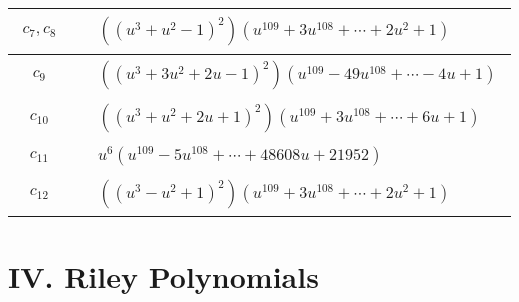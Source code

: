 \documentclass[1p]{elsarticle_modified}
\theoremstyle{definition}
\begin{document}
\begin{tabular}{m{50pt}|m{274pt}}
\hline $$\begin{aligned}c_{7},c_{8}\end{aligned}$$&$\begin{aligned}
&((u^3+u^2-1)^2)(u^{109}+3 u^{108}+\cdots+2 u^2+1)
\end{aligned}$\\
\hline $$\begin{aligned}c_{9}\end{aligned}$$&$\begin{aligned}
&((u^3+3 u^2+2 u-1)^2)(u^{109}-49 u^{108}+\cdots-4 u+1)
\end{aligned}$\\
\hline $$\begin{aligned}c_{10}\end{aligned}$$&$\begin{aligned}
&((u^3+u^2+2 u+1)^2)(u^{109}+3 u^{108}+\cdots+6 u+1)
\end{aligned}$\\
\hline $$\begin{aligned}c_{11}\end{aligned}$$&$\begin{aligned}
&u^6(u^{109}-5 u^{108}+\cdots+48608 u+21952)
\end{aligned}$\\
\hline $$\begin{aligned}c_{12}\end{aligned}$$&$\begin{aligned}
&((u^3- u^2+1)^2)(u^{109}+3 u^{108}+\cdots+2 u^2+1)
\end{aligned}$\\
\hline
\end{tabular}\newpage\renewcommand{\arraystretch}{1}
\centering \section*{ IV. Riley Polynomials}
\end{document}
